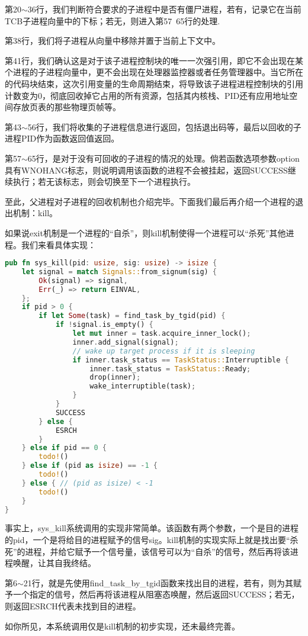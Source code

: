 第20$\sim$36行，我们判断符合要求的子进程中是否有僵尸进程，若有，记录它在当前TCB子进程向量中的下标；若无，则进入第57~65行的处理.

第38行，我们将子进程从向量中移除并置于当前上下文中。

第41行，我们确认这是对于该子进程控制块的唯一一次强引用，即它不会出现在某个进程的子进程向量中，更不会出现在处理器监控器或者任务管理器中。当它所在的代码块结束，这次引用变量的生命周期结束，将导致该子进程进程控制块的引用计数变为0，彻底回收掉它占用的所有资源，包括其内核栈、PID还有应用地址空间存放页表的那些物理页帧等。

第43$\sim$56行，我们将收集的子进程信息进行返回，包括退出码等，最后以回收的子进程PID作为函数返回值返回。

第57$\sim$65行，是对于没有可回收的子进程的情况的处理。倘若函数选项参数option具有WNOHANG标志，则说明调用该函数的进程不会被挂起，返回SUCCESS继续执行；若无该标志，则会切换至下一个进程执行。

至此，父进程对子进程的回收机制也介绍完毕。下面我们最后再介绍一个进程的退出机制：kill。

如果说exit机制是一个进程的“自杀”，则kill机制使得一个进程可以“杀死”其他进程。我们来看具体实现：

\begin{lstlisting}[language={Rust}, label={code:kill},
	caption={os/src/syscall/process.rs}]
pub fn sys_kill(pid: usize, sig: usize) -> isize {
	let signal = match Signals::from_signum(sig) {
		Ok(signal) => signal,
		Err(_) => return EINVAL,
	};
	if pid > 0 {
		if let Some(task) = find_task_by_tgid(pid) {
			if !signal.is_empty() {
				let mut inner = task.acquire_inner_lock();
				inner.add_signal(signal);
				// wake up target process if it is sleeping
				if inner.task_status == TaskStatus::Interruptible {
					inner.task_status = TaskStatus::Ready;
					drop(inner);
					wake_interruptible(task);
				}
			}
			SUCCESS
		} else {
			ESRCH
		}
	} else if pid == 0 {
		todo!()
	} else if (pid as isize) == -1 {
		todo!()
	} else { // (pid as isize) < -1
		todo!()
	}
}
\end{lstlisting}

事实上，sys\_kill系统调用的实现非常简单。该函数有两个参数，一个是目的进程的pid，一个是将给目的进程赋予的信号sig。kill机制的实现实际上就是找出要“杀死”的进程，并给它赋予一个信号量，该信号可以为“自杀”的信号，然后再将该进程唤醒，让其自我终结。

第6$\sim$21行，就是先使用find\_task\_by\_tgid函数来找出目的进程，若有，则为其赋予一个指定的信号，然后再将该进程从阻塞态唤醒，然后返回SUCCESS；若无，则返回ESRCH代表未找到目的进程。

如你所见，本系统调用仅是kill机制的初步实现，还未最终完善。